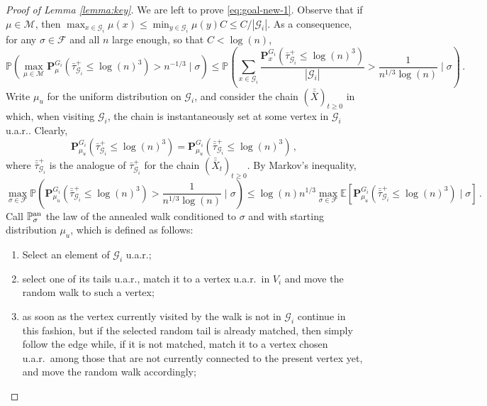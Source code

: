 \documentclass[11pt,oneside]{amsart}
\numberwithin{equation}{section}  %
\theoremstyle{plain}
\newcommand{\E}{\mathbb{E}}
\newcommand{\p}{\mathbb{P}}
\newcommand{\quench}{\mathbf{P}}
\newcommand{\pan}{\p^{\textup{an}}}
\newcommand{\gates}{\mathcal{G}}
\begin{document}
\begin{proof}[Proof of Lemma \ref{lemma:key}]
		We are left to prove \eqref{eq:goal-new-1}. Observe that if $\mu \in \mathcal{M}$, then $\max_{x \in \gates_i}\mu(x)\le \min_{y \in \gates_i}\mu(y)C\le C/|\gates_i|$. As a consequence, for any $\sigma\in\mathcal{F}$ and all $n$ large enough, so that $C < \log(n)$,
		\begin{equation}\label{eq:522}
			\p\left(\max_{\mu\in\mathcal{M}}{\quench}^{G_i}_{{\mu}} (\bar\tau_{\gates_i}^+\le \log(n)^3) > n^{-1/3}\mid \sigma\right)\le \p\left(\sum_{x\in\gates_i}\frac{{\quench}^{G_i}_{{x}} (\bar\tau_{\gates_i}^+\le \log(n)^3)}{|\gates_i|} > \frac1{n^{1/3}\log(n)}\mid \sigma\right)\,.
		\end{equation}
		Write $\mu_u$ for the uniform distribution on $\gates_i$, and consider the chain $(\bar{\bar{X}})_{t\ge0}$ in which, when visiting $\gates_i$, the chain is instantaneously set at some vertex in $\gates_i$ u.a.r.. Clearly,
		\begin{equation}\label{eq:541}
			{\quench}^{G_i}_{\mu_u}(\bar\tau_{\gates_i}^+\le \log(n)^3)=\quench^{G_i}_{\mu_u}(\bar{\bar\tau}_{\gates_i}^+\le \log(n)^3)\,,
		\end{equation}
		where $\bar{\bar{\tau}}_{\gates_i}^+$ is the analogue of $\bar{\tau}_{\gates_i}^+$ for the chain $(\bar{\bar X}_{t})_{t\ge 0}$.
		By Markov's inequality, 
		\begin{equation}\label{eq:517b}
			\max_{\sigma\in\mathcal{F}}	\p\left(\quench^{G_i}_{{\mu_u}} (\bar{\bar{\tau}}_{\gates_i}^+\le \log(n)^3) > \frac1{n^{1/3}\log(n)}\mid \sigma\right) \le\log(n)n^{1/3}\max_{\sigma\in\mathcal{F}} \E[\quench^{G_i}_{{\mu_u}} (\bar{\bar{\tau}}_{\gates_i}^+\le \log(n)^3)\mid \sigma]\,.
		\end{equation}
		Call $\pan_{\sigma}$ the law of the annealed walk conditioned to $\sigma$ and with starting distribution $\mu_u$, which is defined as follows:
		\begin{enumerate}
			\item[(i)] Select an element of $\gates_i$ u.a.r.;
   			\item[(ii)] select one of its tails u.a.r., match it to a vertex u.a.r.~in $V_i$ and move the random walk to such a vertex;
			\item[(iii)] as soon as the vertex currently visited by the walk is not in $\gates_i$ continue in this fashion, but if the selected random tail  is already matched, then simply follow the edge while, if it is not matched, match it to a vertex chosen u.a.r.~among those that are not currently connected to the present vertex yet, and move the random walk accordingly;

\end{enumerate}
\end{proof}
\end{document}
